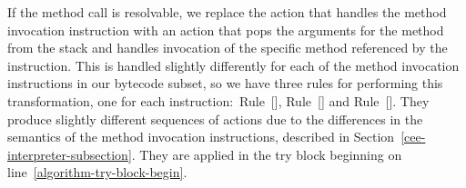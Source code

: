 
If the method call is resolvable, we replace the action that handles
the method invocation instruction with an action that pops the
arguments for the method from the stack and handles invocation of the
specific method referenced by the instruction.
This is handled slightly differently for each of the method invocation
instructions in our bytecode subset, so we have three rules for
performing this transformation, one for each
instruction:~Rule~[],
Rule~[] and
Rule~[].
They produce slightly different sequences of actions due to the
differences in the semantics of the method invocation instructions,
described in Section~\ref{cee-interpreter-subsection}.
They are applied in the try block beginning on
line~\ref{algorithm-try-block-begin}.

